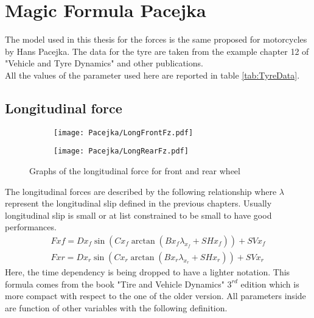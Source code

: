 \chapter{Magic Formula Pacejka}
\label{Ch:MagicFormula}
%
The model used in this thesis for the forces is the same proposed for motorcycles by Hans Pacejka.\cite{pacejka2012tire} The data for the tyre are taken from the example chapter 12 of "Vehicle and Tyre Dynamics" and other publications.\cite{sharp2004advances,sharp2014method}\\
All the values of the parameter used here are reported in table \ref{tab:TyreData}.
%
\section{Longitudinal force}
%
\begin{figure}[hbt]
    \begin{subfigure}{.5\linewidth}
        \texttt{[image: Pacejka/LongFrontFz.pdf]}
        \caption{}
        \label{fig:long1a}
    \end{subfigure}%
    \begin{subfigure}{.5\linewidth}
        \texttt{[image: Pacejka/LongRearFz.pdf]}
        \caption{}
        \label{fig:long1b}
    \end{subfigure}
    \caption{Graphs of the longitudinal force for front and rear wheel}
\end{figure}
%
%
The longitudinal forces are described by the following relationship where $\lambda$ represent the longitudinal slip defined in the previous chapters. Usually longitudinal slip is small or at list constrained to be small to have good performances.
%
\begin{equation}
    \begin{array}{l}
        Fxf = Dx_f  \sin( Cx_f  \arctan(Bx_f  \lambda_{x_f} + SHx_f  ) ) + SVx_f\\
        Fxr = Dx_r  \sin( Cx_r  \arctan(Bx_r  \lambda_{x_r} + SHx_r  ) ) + SVx_r
    \end{array}
\end{equation}
%
Here, the time dependency is being dropped to have a lighter notation. This formula comes from the book "Tire and Vehicle Dynamics" $3^{rd}$ edition\cite{pacejka2012tire} which is more compact with respect to the one of the older version\cite{pacejka2006tyre}.
All parameters inside are function of other variables with the following definition.
%
